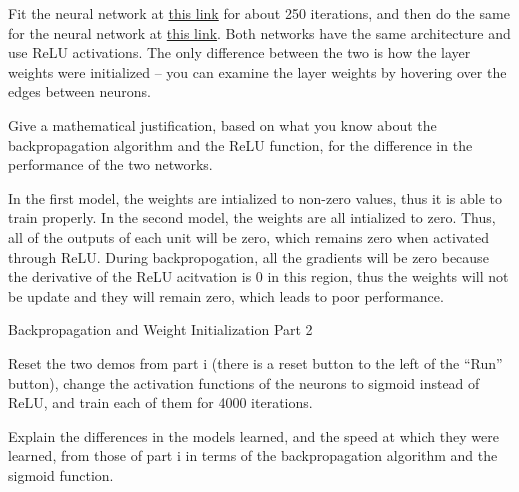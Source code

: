 Fit the neural network at \href{http://playground.tensorflow.org/#activation=relu&batchSize=10&dataset=circle&regDataset=reg-plane&learningRate=0.03&regularizationRate=0&noise=0&networkShape=4,2&seed=0.65409&showTestData=false&discretize=false&percTrainData=50&x=true&y=true&xTimesY=false&xSquared=false&ySquared=false&cosX=false&sinX=false&cosY=false&sinY=false&collectStats=false&problem=classification&initZero=false&hideText=false}{this link} for about 250 iterations, and then do the same for the neural network at  \href{http://playground.tensorflow.org//\#activation=relu&batchSize=10&dataset=circle&regDataset=reg-plane&learningRate=0.03&regularizationRate=0&noise=0&networkShape=4,2&seed=0.6&showTestData=false&discretize=false&percTrainData=50&x=true&y=true&xTimesY=false&xSquared=false&ySquared=false&cosX=false&sinX=false&cosY=false&sinY=false&collectStats=false&problem=classification&initZero=true&hideText=false}{this link}.  Both networks have the same architecture and use ReLU activations.  The only difference between the two is how the layer weights were initialized -- you can examine the layer weights by hovering over the edges between neurons.

Give a mathematical justification, based on what you know about the backpropagation algorithm and the ReLU function, for the difference in the performance of the two networks.

\begin{subsolution}
  In the first model, the weights are intialized to non-zero values, thus it is able to train properly. In the second model, the weights are all intialized to zero. Thus, all of the outputs of each unit will be zero, which remains zero when activated through ReLU. During backpropogation, all the gradients will be zero because the derivative of the ReLU acitvation is 0 in this region, thus the weights will not be update and they will remain zero, which leads to poor performance.
\end{subsolution}

\begin{problem}[5]
  Backpropagation and Weight Initialization Part 2
\end{problem}
Reset the two demos from part i (there is a reset button to the left of the ``Run'' button), change the activation functions of the neurons to sigmoid instead of ReLU, and train each of them for 4000 iterations.

Explain the differences in the models learned, and the speed at which they were learned, from those of part i in terms of the backpropagation algorithm and the sigmoid function.



